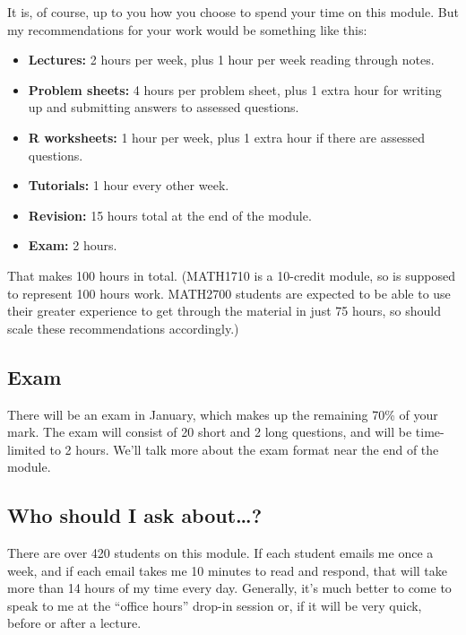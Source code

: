 \documentclass[
  letterpaper,
  DIV=11,
  numbers=noendperiod]{scrreprt}
\providecommand{\tightlist}{%
  \setlength{\itemsep}{0pt}\setlength{\parskip}{0pt}}\usepackage{longtable,booktabs,array}
\theoremstyle{remark}
\begin{document}
It is, of course, up to you how you choose to spend your time on this
module. But my recommendations for your work would be something like
this:

\begin{itemize}
\tightlist
\item
  \textbf{Lectures:} 2 hours per week, plus 1 hour per week reading
  through notes.
\item
  \textbf{Problem sheets:} 4 hours per problem sheet, plus 1 extra hour
  for writing up and submitting answers to assessed questions.
\item
  \textbf{R worksheets:} 1 hour per week, plus 1 extra hour if there are
  assessed questions.
\item
  \textbf{Tutorials:} 1 hour every other week.
\item
  \textbf{Revision:} 15 hours total at the end of the module.
\item
  \textbf{Exam:} 2 hours.
\end{itemize}

That makes 100 hours in total. (MATH1710 is a 10-credit module, so is
supposed to represent 100 hours work. MATH2700 students are expected to
be able to use their greater experience to get through the material in
just 75 hours, so should scale these recommendations accordingly.)

\hypertarget{exam}{%
\subsection*{Exam}\label{exam}}

There will be an exam in January, which makes up the remaining 70\% of
your mark. The exam will consist of 20 short and 2 long questions, and
will be time-limited to 2 hours. We'll talk more about the exam format
near the end of the module.

\hypertarget{ask}{%
\subsection*{Who should I ask about\ldots?}\label{ask}}

There are over 420 students on this module. If each student emails me
once a week, and if each email takes me 10 minutes to read and respond,
that will take more than 14 hours of my time every day. Generally, it's
much better to come to speak to me at the ``office hours'' drop-in
session or, if it will be very quick, before or after a lecture.
\end{document}
